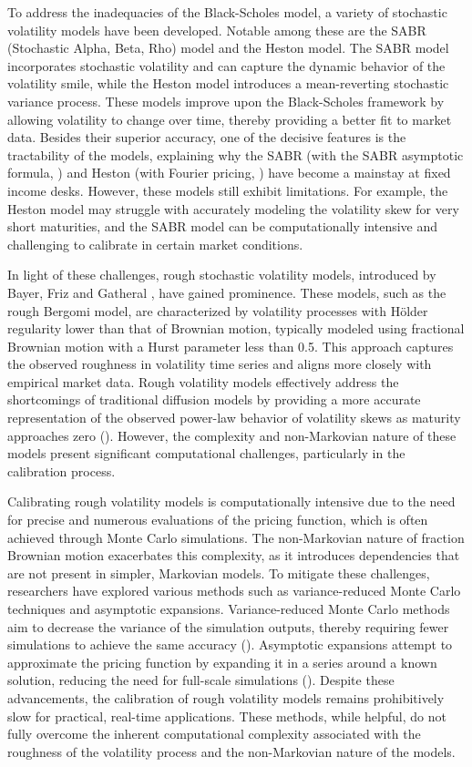 \documentclass{article}
\theoremstyle{remark}
\begin{document}
To address the inadequacies of the Black-Scholes model, a variety of stochastic volatility models have been developed.
Notable among these are the SABR (Stochastic Alpha, Beta, Rho) model and the Heston model.
The SABR model incorporates stochastic volatility and can capture the dynamic behavior of the volatility smile,
while the Heston model introduces a mean-reverting stochastic variance process.
These models improve upon the Black-Scholes framework by allowing volatility to change over time,
thereby providing a better fit to market data.
Besides their superior accuracy, one of the decisive features is the tractability of the models, explaining why the SABR
(with the SABR asymptotic formula, \cite{Hagan1}) and Heston (with Fourier pricing, \cite{Hes93}) have become a mainstay at fixed income desks.
However, these models still exhibit limitations.
For example, the Heston model may struggle with accurately modeling the volatility skew for very short maturities,
and the SABR model can be computationally intensive and challenging to calibrate in certain market conditions.

In light of these challenges, rough stochastic volatility models, introduced by Bayer, Friz and Gatheral \cite{BFG15},  have gained prominence.
These models, such as the rough Bergomi model, are characterized by volatility processes with H\"older regularity lower
than that of Brownian motion, typically modeled using fractional Brownian motion with a Hurst parameter less than 0.5.
This approach captures the observed roughness in volatility time series and aligns more closely with empirical market data.
Rough volatility models effectively address the shortcomings of traditional diffusion models by providing a more accurate
representation of the observed power-law behavior of volatility skews as maturity approaches zero (\cite{AlosLeon, BFG15, BFGHS, Fukasawa}).
However, the complexity and non-Markovian nature of these models present significant computational challenges,
particularly in the calibration process.

Calibrating rough volatility models is computationally intensive due to the need for precise and numerous evaluations
of the pricing function, which is often achieved through Monte Carlo simulations.
The non-Markovian nature of fraction Brownian motion exacerbates this complexity, as it introduces dependencies
that are not present in simpler, Markovian models.
To mitigate these challenges, researchers have explored various methods such as variance-reduced Monte Carlo techniques and asymptotic expansions.
Variance-reduced Monte Carlo methods aim to decrease the variance of the simulation outputs, thereby requiring fewer simulations to achieve the same accuracy (\cite{BFGMS17, BFG15, HJM17, MP18}).
Asymptotic expansions attempt to approximate the pricing function by expanding it in a series around a known solution, reducing the need
for full-scale simulations (\cite{BFGHS, FZ17}).
Despite these advancements, the calibration of rough volatility models remains prohibitively slow for practical, real-time applications.
These methods, while helpful, do not fully overcome the inherent computational complexity associated with the roughness
of the volatility process and the non-Markovian nature of the models.
\end{document}
